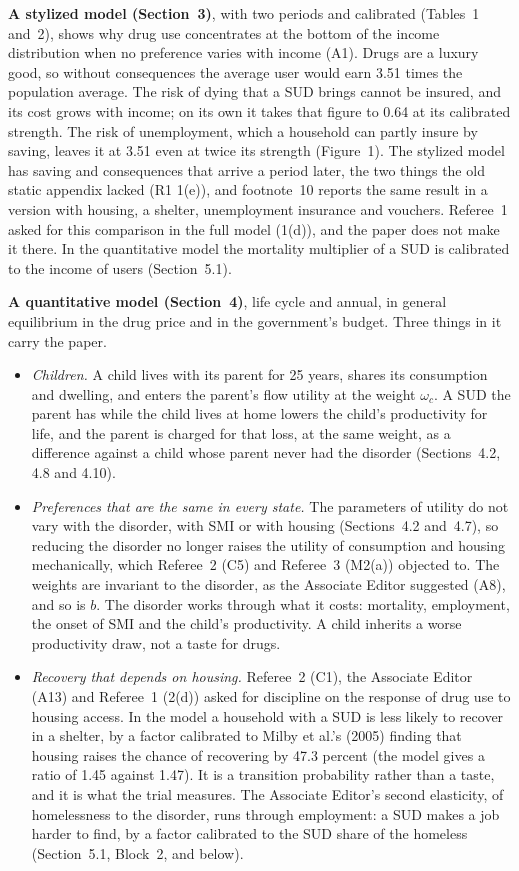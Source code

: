 \documentclass[11pt]{article}
\begin{document}
{\color{respred}
\textbf{A stylized model (Section~3)}, with two periods and calibrated (Tables~1 and~2),
shows why drug use concentrates at the bottom of the income distribution when no
preference varies with income (A1). Drugs are a luxury good, so without consequences the
average user would earn 3.51 times the population average. The risk of dying that a SUD
brings cannot be insured, and its cost grows with income; on its own it takes that figure
to 0.64 at its calibrated strength. The risk of unemployment, which a household can partly
insure by saving, leaves it at 3.51 even at twice its strength (Figure~1). The stylized model
has saving and consequences that arrive a period later, the two things the old static
appendix lacked (R1 1(e)), and footnote~10 reports the same result in a version with
housing, a shelter, unemployment insurance and vouchers. \open Referee~1 asked for this
comparison in the full model (1(d)), and the paper does not make it there. In the
quantitative model the mortality multiplier of a SUD is calibrated to the income of users
(Section~5.1).

\textbf{A quantitative model (Section~4)}, life cycle and annual, in general equilibrium in
the drug price and in the government's budget. Three things in it carry the paper.
\begin{itemize}
\item \emph{Children.} A child lives with its parent for 25 years, shares its consumption and
dwelling, and enters the parent's flow utility at the weight $\omega_c$. A SUD the parent has
while the child lives at home lowers the child's productivity for life, and the parent is
charged for that loss, at the same weight, as a difference against a child whose parent
never had the disorder (Sections~4.2, 4.8 and 4.10).
\item \emph{Preferences that are the same in every state.} The parameters of utility do not
vary with the disorder, with SMI or with housing (Sections~4.2 and~4.7), so reducing the
disorder no longer raises the utility of consumption and housing mechanically, which
Referee~2 (C5) and Referee~3 (M2(a)) objected to. The weights are invariant to the
disorder, as the Associate Editor suggested (A8), and so is $b$. The disorder works through
what it costs: mortality, employment, the onset of SMI and the child's productivity. A
child inherits a worse productivity draw, not a taste for drugs.
\item \emph{Recovery that depends on housing.} Referee~2 (C1), the Associate Editor (A13) and
Referee~1 (2(d)) asked for discipline on the response of drug use to housing access. In the
model a household with a SUD is less likely to recover in a shelter, by a factor calibrated
to Milby et al.'s (2005) finding that housing raises the chance of recovering by 47.3
percent (the model gives a ratio of 1.45 against 1.47). It is a transition probability
rather than a taste, and it is what the trial measures. The Associate Editor's second
elasticity, of homelessness to the disorder, runs through employment: a SUD makes a job
harder to find, by a factor calibrated to the SUD share of the homeless (Section~5.1, Block~2,
and below).
\end{itemize}
}
\end{document}
